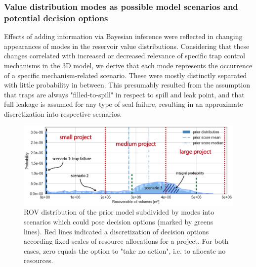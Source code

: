 	\subsubsection{Value distribution modes as possible model scenarios and potential decision options}	
	Effects of adding information via Bayesian inference were reflected in changing appearances of modes in the reservoir value distributions. Considering that these changes correlated with increased or decreased relevance of specific trap control mechanisms in the 3D model, we derive that each mode represents the occurrence of a specific mechanism-related scenario. These were mostly distinctly separated with little probability in between. This presumably resulted from the assumption that traps are always "filled-to-spill" in respect to spill and leak point, and that full leakage is assumed for any type of seal failure, resulting in an approximate discretization into respective scenarios.
	\begin{figure}[h]
		\centering
		\includegraphics[width=1\textwidth]{Figures/scenarios_options}
		\caption{ROV distribution of the prior model subdivided by modes into scenarios which could pose decision options (marked by greens lines). Red lines indicated a discretization of decision options according fixed scales of resource allocations for a project. For both cases, zero equals the option to "take no action", i.e. to allocate no resources.}\label{fig:scenarios_options}
	\end{figure}\\
